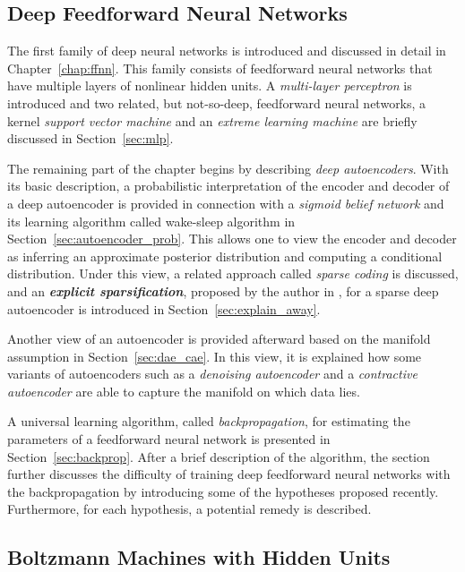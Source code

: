 \documentclass[dissertation,nocontribution,draft*]{aaltoseries}
\begin{document}
\subsection{Deep Feedforward Neural Networks}

The first family of deep neural networks is introduced and
discussed in detail in Chapter~\ref{chap:ffnn}. This family
consists of feedforward neural networks that have multiple
layers of nonlinear hidden units.  A \textit{multi-layer
perceptron} is introduced and two related, but not-so-deep,
feedforward neural networks, a kernel \textit{support
vector machine} and an \textit{extreme learning machine} are
briefly discussed in Section~\ref{sec:mlp}.

The remaining part of the chapter begins by describing
\textit{deep autoencoders}. With its basic description, a
probabilistic interpretation of the encoder and decoder of a
deep autoencoder is provided in connection with a
\textit{sigmoid belief network} and its learning algorithm
called wake-sleep algorithm in
Section~\ref{sec:autoencoder_prob}. This allows one to view
the encoder and decoder as inferring an approximate
posterior distribution and computing a conditional
distribution. Under this view, a related approach called
\textit{sparse coding} is discussed, and an
\textbf{\textit{explicit sparsification}}, proposed by the
author in , for a sparse deep
autoencoder is introduced in Section~\ref{sec:explain_away}.

Another view of an autoencoder is provided afterward based
on the manifold assumption in Section~\ref{sec:dae_cae}. In
this view, it is explained how some variants of autoencoders
such as a \textit{denoising autoencoder} and a
\textit{contractive autoencoder} are able to capture the
manifold on which data lies. 

A universal learning algorithm, called 
\textit{backpropagation}, for estimating the parameters of a
feedforward neural network is presented in
Section~\ref{sec:backprop}. After a brief description of the
algorithm, the section further discusses the difficulty of
training deep feedforward neural networks with the
backpropagation by introducing some of the hypotheses
proposed recently. Furthermore, for each hypothesis, a
potential remedy is described.

\subsection{Boltzmann Machines with Hidden Units}
\end{document}
